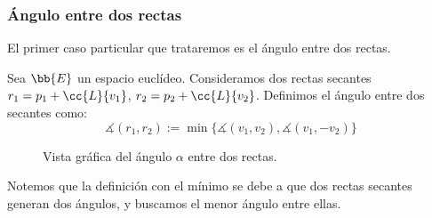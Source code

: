 \subsubsection{Ángulo entre dos rectas}
El primer caso particular que trataremos es el ángulo entre dos rectas.
\begin{definicion}
    Sea $\bb{E}$ un espacio euclídeo. Consideramos dos rectas secantes $r_1=p_1 + \cc{L}\{v_1\}$, $r_2=p_2 + \cc{L}\{v_2\}$. Definimos el ángulo entre dos secantes como:
    \begin{equation*}
        \measuredangle(r_1,r_2)
        := \min\{\measuredangle(v_1,v_2), \measuredangle(v_1,-v_2)\}
    \end{equation*}
    \begin{figure}[H]
        \centering
        \caption{Vista gráfica del ángulo $\alpha$ entre dos rectas.}
    \end{figure}
\end{definicion}
Notemos que la definición con el mínimo se debe a que dos rectas secantes generan dos ángulos, y buscamos el menor ángulo entre ellas.

